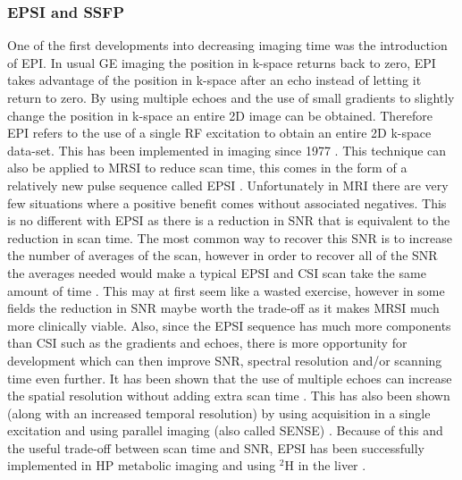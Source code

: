 \subsubsection{EPSI and SSFP}

One of the first developments into decreasing imaging time was the introduction of \ac{EPI}. In usual \ac{GE} imaging the position in k-space returns back to zero, \ac{EPI} takes advantage of the position in k-space after an echo instead of letting it return to zero. By using multiple echoes and the use of small gradients to slightly change the position in k-space an entire 2D image can be obtained. Therefore \ac{EPI} refers to the use of a single \ac{RF} excitation to obtain an entire 2D k-space data-set. This has been implemented in imaging since 1977 \cite{Mansfield1977Multi-planarEchoes}. This technique can also be applied to \ac{MRSI} to reduce scan time, this comes in the form of a relatively new pulse sequence called \ac{EPSI} \cite{Mulkern2001EchoImaging}. Unfortunately in \ac{MRI} there are very few situations where a positive benefit comes without associated negatives. This is no different with \ac{EPSI} as there is a reduction in \ac{SNR} that is equivalent to the reduction in scan time. The most common way to recover this \ac{SNR} is to increase the number of averages of the scan, however in order to recover all of the \ac{SNR} the averages needed would make a typical \ac{EPSI} and \ac{CSI} scan take the same amount of time \cite{Mulkern2001EchoImaging}. This may at first seem like a wasted exercise, however in some fields the reduction in \ac{SNR} maybe worth the trade-off as it makes \ac{MRSI} much more clinically viable. Also, since the \ac{EPSI} sequence has much more components than \ac{CSI} such as the gradients and echoes, there is more opportunity for development which can then improve \ac{SNR}, spectral resolution and/or scanning time even further. It has been shown that the use of multiple echoes can increase the spatial resolution without adding extra scan time \cite{Furuyama2011Multi-echo-basedScanner}. This has also been shown (along with an increased temporal resolution) by using acquisition in a single excitation and using parallel imaging (also called \ac{SENSE}) \cite{Posse2009Single-shotImaging}. Because of this and the useful trade-off between scan time and SNR, \ac{EPSI} has been successfully implemented in \ac{HP} metabolic imaging \cite{Topping2020AcquisitionNuclei,Eldirdiri2018DevelopmentScanner} and using $^2$H in the liver \cite{Min2023Deuterium7T}.

